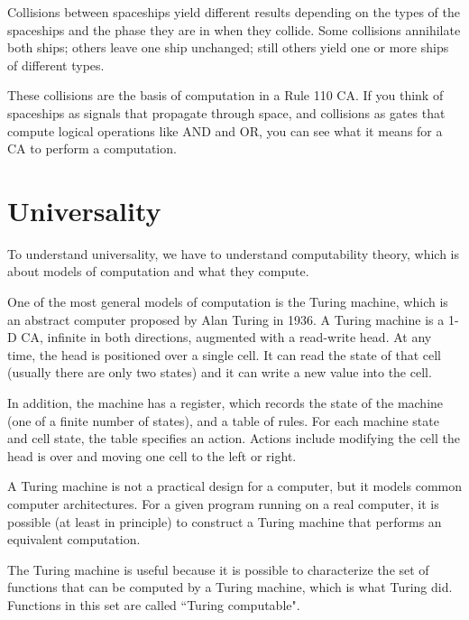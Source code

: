 \documentclass[12pt]{book}
\theoremstyle{exercise}
\begin{document}

Collisions between spaceships yield different results
depending on the types of the spaceships and the phase they are in
when they collide.  Some collisions annihilate both ships; others
leave one ship unchanged; still others yield one or more ships of
different types.

These collisions are the basis of computation in a Rule 110 CA.  If
you think of spaceships as signals that propagate through space, and
collisions as gates that compute logical operations like AND and OR,
you can see what it means for a CA to perform a computation.


\section{Universality}

To understand universality, we have to understand computability
theory, which is about models of computation and what they compute.


One of the most general models of computation is the Turing machine,
which is an abstract computer proposed by Alan Turing in 1936.  A
Turing machine is a 1-D CA, infinite in both directions, augmented
with a read-write head.  At any time, the head is positioned over a
single cell.  It can read the state of that cell (usually there are
only two states) and it can write a new value into the cell.


In addition, the machine has a register, which records the state
of the machine (one of a finite number of states), and a table
of rules.  For each machine state and cell state, the table
specifies an action.  Actions include modifying the cell
the head is over and moving one cell to the left or right.


A Turing machine is not a practical design for a computer, but it
models common computer architectures.  For a given program running on
a real computer, it is possible (at least in principle) to construct a
Turing machine that performs an equivalent computation.

The Turing machine is useful because it is possible to characterize
the set of functions that can be computed by a Turing machine,
which is what Turing did.  Functions in this set are
called ``Turing computable".
\end{document}
